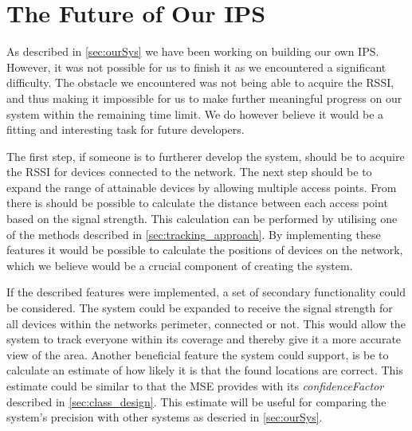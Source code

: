\section{The Future of Our IPS}\label{sec:futureSystem}
As described in \cref{sec:ourSys} we have been working on building our own IPS. However, it was not possible for us to finish it as we encountered a significant difficulty. The obstacle we encountered was not being able to acquire the RSSI, and thus making it impossible for us to make further meaningful progress on our system within the remaining time limit. We do however believe it would be a fitting and interesting task for future developers.

The first step, if someone is to furtherer develop the system, should be to acquire the RSSI for devices connected to the network. The next step should be to expand the range of attainable devices by allowing multiple access points. From there is should be possible to calculate the distance between each access point based on the signal strength. This calculation can be performed by utilising one of the methods described in \cref{sec:tracking_approach}. By implementing these features it would be possible to calculate the positions of devices on the network, which we believe would be a crucial component of creating the system.

If the described features were implemented, a set of secondary functionality could be considered. The system could be expanded to receive the signal strength for all devices within the networks perimeter, connected or not. This would allow the system to track everyone within its coverage and thereby give it a more accurate view of the area.
Another beneficial feature the system could support, is be to calculate an estimate of how likely it is that the found locations are correct. This estimate could be similar to that the MSE provides with its \textit{confidenceFactor} described in \cref{sec:class_design}. This estimate will be useful for comparing the system's precision with other systems as descried in \cref{sec:ourSys}.